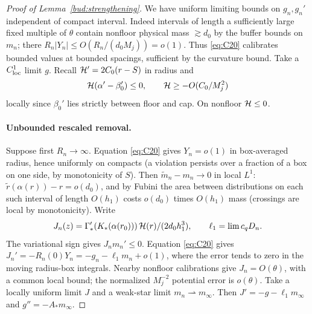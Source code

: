 \begin{proof}[Proof of Lemma~\ref{bud:strengthening}]
We have uniform limiting bounds on \(g_n,g_n'\) independent of compact interval. Indeed intervals of length a sufficiently large fixed multiple of \(\theta\) contain nonfloor physical mass \(\gtrsim d_0\) by the buffer bounds on \(m_n\); there \(R_n|Y_n|\le O(R_n/(d_0 M_j))=o(1)\). Thus \eqref{eq:C20} calibrates bounded values at bounded spacings, sufficient by the curvature bound. Take a \(C^1_{\rm loc}\) limit \(g\). Recall \({\cal H}'=2C_0(r-S)\) in radius and
\[
 {\cal H}(\alpha'-\beta_0')\le0,\qquad {\cal H}\ge-O(C_0/M_j^2)
\]
locally since \(\beta_0'\) lies strictly between floor and cap. On nonfloor \({\cal H}\le0\).

\paragraph{Unbounded rescaled removal.}


Suppose first \(R_n\to\infty\). Equation \eqref{eq:C20} gives \(Y_n=o(1)\) in box-averaged radius, hence uniformly on compacts (a violation persists over a fraction of a box on one side, by monotonicity of \(S\)). Then \(\widetilde m_n-m_n\to0\) in local \(L^1\): \(\widetilde r(\alpha(r))-r=o(d_0)\), and by Fubini the area between distributions on each such interval of length \(O(h_1)\) costs \(o(d_0)\) times \(O(h_1)\) mass (crossings are local by monotonicity). Write
\[
 J_n(z)=\Gamma_*'(K_*(\alpha(r_0)))\,{\cal H}(r)/(2d_0 h_1^3),\qquad
 \ell_1=\lim c_q D_n .
\]
The variational sign gives \(J_nm_n'\le0\). Equation
\eqref{eq:C20} gives
\(J_n'=-R_n(0)Y_n=-g_n-\ell_1m_n+o(1)\), where the error tends
to zero in the moving radius-box integrals. Nearby nonfloor
calibrations give \(J_n=O(\theta)\), with a common local bound;
the normalized \(M_j^{-2}\) potential error is \(o(\theta)\).
Take a locally uniform limit \(J\) and a weak-star limit
\(m_n\rightharpoonup m_\infty\). Then
\(J'=-g-\ell_1m_\infty\) and \(g''=-A_*m_\infty\).


\end{proof}
